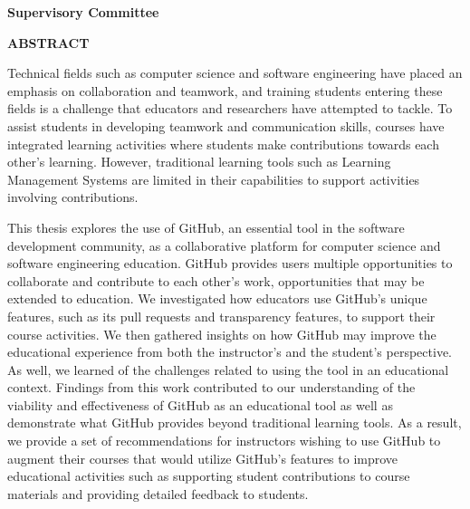 \newpage
{}

\noindent \textbf{Supervisory Committee}
\tpbreak
\panel

\begin{center}
\textbf{ABSTRACT}
\end{center}


Technical fields such as computer science and software engineering have placed an emphasis on collaboration and teamwork, and training students entering these fields is a challenge that educators and researchers have attempted to tackle. To assist students in developing teamwork and communication skills, courses have integrated learning activities where students make contributions towards each other's learning. However, traditional learning tools such as Learning Management Systems are limited in their capabilities to support activities involving contributions.

This thesis explores the use of GitHub, an essential tool in the software development community, as a collaborative platform for computer science and software engineering education. GitHub provides users multiple opportunities to collaborate and contribute to each other's work, opportunities that may be extended to education. We investigated how educators use GitHub's unique features, such as its pull requests and transparency features, to support their course activities. We then gathered insights on how GitHub may improve the educational experience from both the instructor's and the student's perspective. As well, we learned of the challenges related to using the tool in an educational context. Findings from this work contributed to our understanding of the viability and effectiveness of GitHub as an educational tool as well as demonstrate what GitHub provides beyond traditional learning tools. As a result, we provide a set of recommendations for instructors wishing to use GitHub to augment their courses that would utilize GitHub's features to improve educational activities such as supporting student contributions to course materials and providing detailed feedback to students.
